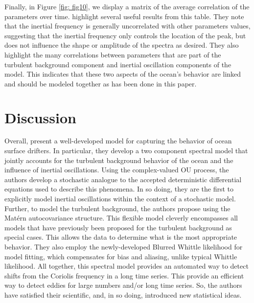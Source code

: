 \documentclass{stat572Style}
\begin{document}
\par Finally, in Figure \ref{fig: fig10}, we display a matrix of the average correlation of the parameters over time. \citet{Sykulski2016} highlight several useful results from this table. 
They note that the inertial frequency is generally uncorrelated with other parameters values, suggesting that the inertial frequency only controls the location of the peak, but does not influence the shape or amplitude of the spectra as desired. 
They also highlight the many correlations between parameters that are part of the turbulent background component and inertial oscillation components of the model. 
This indicates that these two aspects of the ocean's behavior are linked and should be modeled together as has been done in this paper. 




\section{Discussion}
\par Overall, \citet{Sykulski2016} present a  well-developed model for capturing the behavior of ocean surface drifters.
 In particular, they develop a two component spectral model that jointly accounts for the turbulent background behavior of the ocean and the influence of inertial oscillations. 
 Using the complex-valued OU process, the authors develop a stochastic analogue to the accepted deterministic differential equations used to describe this phenomena. 
 In so doing, they are the first to explicitly model inertial oscillations within the context of a stochastic model. 
 Further, to model the turbulent background, the authors propose using the  Mat\'{e}rn autocovariance structure.
  This flexible model cleverly encompasses all models that have previously been proposed for the turbulent background as special cases.
  This allows the data to determine what is the most appropriate behavior. 
   They also employ the newly-developed Blurred Whittle likelihood for model fitting, which compensates for bias and aliasing, unlike typical Whittle likelihood. 
   All together, this spectral model provides an automated way to detect shifts from the Coriolis frequency in a long time series. 
This provide an efficient way to detect eddies for large numbers and/or long time series. 
So, the authors have  satisfied their scientific, and, in so doing, introduced new statistical ideas.
\end{document}
